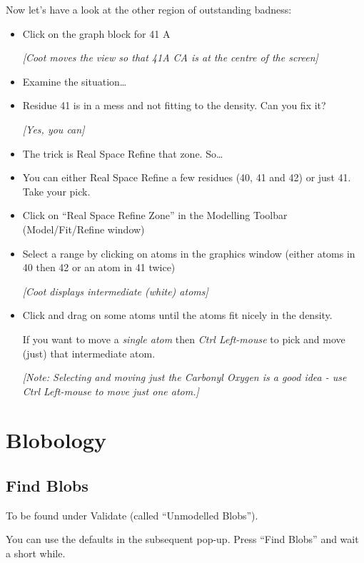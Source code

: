 \documentclass{article}
\begin{document}
Now let's have a look at the other region of outstanding badness:
\begin{itemize}
\item Click on the graph block for 41 A

\textsl{ [Coot moves the view so that 41A CA is at the centre of the screen]}

\item Examine the situation\ldots
\item Residue 41 is in a mess and not fitting to the density.  Can you
  fix it?

  \emph{ [Yes, you can] } 
\item The trick is Real Space Refine that zone. So\ldots
\item You can either Real Space Refine a few residues (40, 41 and 42)
  or just 41.  Take your pick.
\item Click on \textsf{``Real Space Refine Zone''} in the
  Modelling Toolbar (Model/Fit/Refine window)
\item Select a range by clicking on atoms in the graphics window
  (either atoms in 40 then 42 or an atom in 41 twice)

\textsl{[Coot displays intermediate (white) atoms]}

\item Click and drag on some atoms until the atoms fit nicely in the
  density.  

  If you want to move a \emph{single atom} then \emph{Ctrl Left-mouse}
  to pick and move (just) that intermediate atom.
  
  \emph{[Note: Selecting and moving just the Carbonyl Oxygen is a
    good idea - use Ctrl Left-mouse to move just one atom.]}

\end{itemize}


\section{Blobology}

\subsection{Find Blobs}
To be found under Validate (called ``Unmodelled Blobs'').  


You can use the defaults in the subsequent pop-up. Press ``Find Blobs''
and wait a short while.
\end{document}
